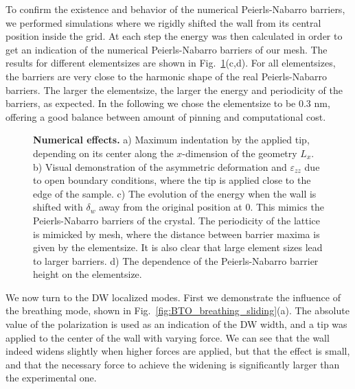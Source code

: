 To confirm the existence and behavior of the numerical Peierls-Nabarro barriers, we performed simulations where we rigidly shifted the wall from its central position inside the grid.
At each step the energy was then calculated in order to get an indication of the numerical Peierls-Nabarro barriers of our mesh.
The results for different elementsizes are shown in Fig.~\ref{fig:BTO_numerical_effects}(c,d).
For all elementsizes, the barriers are very close to the harmonic shape of the real Peierls-Nabarro barriers. The larger the elementsize, the larger the energy and periodicity of the barriers, as expected.
In the following we chose the elementsize to be 0.3 nm, offering a good balance between amount of pinning and computational cost. 
\begin{figure}[h!]
	\caption{\label{fig:BTO_numerical_effects}{\bf Numerical effects.} a) Maximum indentation by the applied tip, depending on its center along the $x$-dimension of the geometry $L_x$. b) Visual demonstration of the asymmetric deformation and $\varepsilon_{zz}$ due to open boundary conditions, where the tip is applied close to the edge of the sample. c) The evolution of the energy when the wall is shifted with $\delta_w$ away from the original position at 0. This mimics the Peierls-Nabarro barriers of the crystal. The periodicity of the lattice is mimicked by mesh, where the distance between barrier maxima is given by the elementsize. It is also clear that large element sizes lead to larger barriers. d) The dependence of the Peierls-Nabarro barrier height on the elementsize.}
\end{figure}

We now turn to the DW localized modes.
First we demonstrate the influence of the breathing mode, shown in Fig.~\ref{fig:BTO_breathing_sliding}(a).
The absolute value of the polarization is used as an indication of the DW width, and a tip was applied to the center of the wall with varying force.
We can see that the wall indeed widens slightly when higher forces are applied, but that the effect is small, and that the necessary force to achieve the widening is significantly larger than the experimental one.

